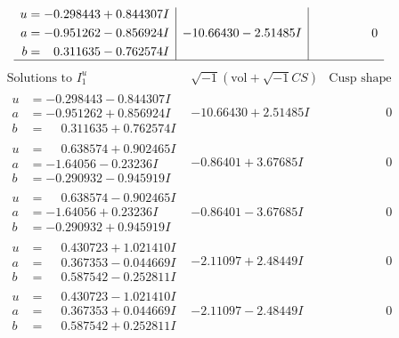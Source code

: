 \documentclass[1p]{elsarticle_modified}
\theoremstyle{definition}
\newcommand{\I}{\sqrt{-1}}
\begin{document}
$$\begin{array}{c|c|c}
\begin{aligned}
u &= -0.298443 + 0.844307 I \\
a &= -0.951262 - 0.856924 I \\
b &= \phantom{-}0.311635 - 0.762574 I\end{aligned}
 & -10.66430 - 2.51485 I & \phantom{-0.000000 } 0\\
 \hline 
 \end{array}$$\newpage$$\begin{array}{c|c|c}  
\text{Solutions to }I^u_{1}& \I (\text{vol} + \sqrt{-1}CS) & \text{Cusp shape}\\
 \hline 
\begin{aligned}
u &= -0.298443 - 0.844307 I \\
a &= -0.951262 + 0.856924 I \\
b &= \phantom{-}0.311635 + 0.762574 I\end{aligned}
 & -10.66430 + 2.51485 I & \phantom{-0.000000 } 0 \\ \hline\begin{aligned}
u &= \phantom{-}0.638574 + 0.902465 I \\
a &= -1.64056 - 0.23236 I \\
b &= -0.290932 - 0.945919 I\end{aligned}
 & -0.86401 + 3.67685 I & \phantom{-0.000000 } 0 \\ \hline\begin{aligned}
u &= \phantom{-}0.638574 - 0.902465 I \\
a &= -1.64056 + 0.23236 I \\
b &= -0.290932 + 0.945919 I\end{aligned}
 & -0.86401 - 3.67685 I & \phantom{-0.000000 } 0 \\ \hline\begin{aligned}
u &= \phantom{-}0.430723 + 1.021410 I \\
a &= \phantom{-}0.367353 - 0.044669 I \\
b &= \phantom{-}0.587542 - 0.252811 I\end{aligned}
 & -2.11097 + 2.48449 I & \phantom{-0.000000 } 0 \\ \hline\begin{aligned}
u &= \phantom{-}0.430723 - 1.021410 I \\
a &= \phantom{-}0.367353 + 0.044669 I \\
b &= \phantom{-}0.587542 + 0.252811 I\end{aligned}
 & -2.11097 - 2.48449 I & \phantom{-0.000000 } 0 \\ \hline\begin{aligned}

\end{aligned}
\end{array}$$
\end{document}
